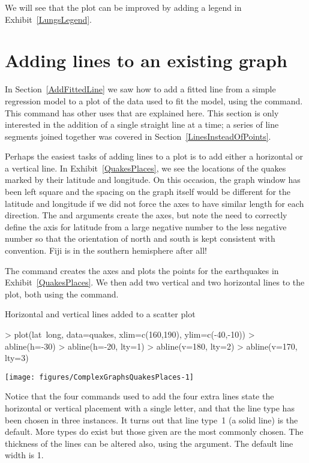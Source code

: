 We will see that the plot can be improved by adding a legend in Exhibit~\ref{LungsLegend}. 
 
 
\section{Adding lines to an existing graph} 
 
In Section~\ref{AddFittedLine} we saw how to add a fitted line from a simple regression model to a plot of the data used to fit the model, using the  command. This command has other uses that are explained here. This section is only interested in the addition of a single straight line at a time; a series of line segments joined together was covered in Section~\ref{LinesInsteadOfPoints}. 
 
Perhaps the easiest tasks of adding lines to a plot is to add either a horizontal or a vertical line. In Exhibit~\ref{QuakesPlaces}, we see the locations of the quakes marked by their latitude and longitude. On this occasion, the graph window has been left square and the spacing on the graph itself would be different for the latitude and longitude if we did not force the axes to have similar length for each direction. The  and  arguments create the axes, but note the need to correctly define the axis for latitude from a large negative number to the less negative number so that the orientation of north and south is kept consistent with convention. Fiji is in the southern hemisphere after all! 
 
The  command creates the axes and plots the points for the earthquakes in Exhibit~\ref{QuakesPlaces}. We then add two vertical and two horizontal lines to the plot, both using the  command. 
\begin{exhibit} 
\begin{center} 
\caption{Horizontal and vertical lines added to a scatter plot} 
\label{QuakesPlaces} 

\begin{Schunk}
\begin{Sinput}
> plot(lat~long, data=quakes, xlim=c(160,190), ylim=c(-40,-10)) 
> abline(h=-30) 
> abline(h=-20, lty=1) 
> abline(v=180, lty=2) 
> abline(v=170, lty=3) 
\end{Sinput}

\texttt{[image: figures/ComplexGraphsQuakesPlaces-1]} \end{Schunk}

\end{center} 
\end{exhibit} 
Notice that the four commands used to add the four extra lines state the horizontal or vertical placement with a single letter, and that the line type has been chosen in three instances. It turns out that line type~1 (a solid line) is the default. More types do exist but those given are the most commonly chosen. The thickness of the lines can be altered also, using the  argument. The default line width is 1. 
 
